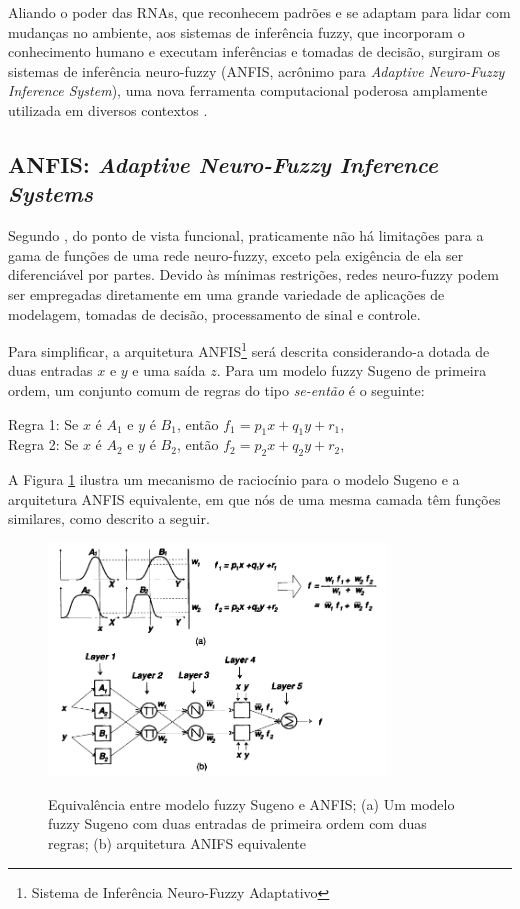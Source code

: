 Aliando o poder das RNAs, que reconhecem padrões e se adaptam para lidar com mudanças no ambiente, aos sistemas de inferência fuzzy, que incorporam o conhecimento humano e executam inferências e tomadas de decisão, surgiram os sistemas de inferência neuro-fuzzy (ANFIS, acrônimo para \textit{Adaptive Neuro-Fuzzy Inference System}), uma nova ferramenta computacional poderosa amplamente utilizada em diversos contextos \cite[p.~1]{Jang1997}.

\subsection{ANFIS: \textit{Adaptive Neuro-Fuzzy Inference Systems}}
Segundo , do ponto de vista funcional, praticamente não há limitações para a gama de funções de uma rede neuro-fuzzy, exceto pela exigência de ela ser diferenciável por partes. Devido às mínimas restrições, redes neuro-fuzzy podem ser empregadas diretamente em uma grande variedade de aplicações de modelagem, tomadas de decisão, processamento de sinal e controle.

Para simplificar, a arquitetura ANFIS\footnote{Sistema de Inferência Neuro-Fuzzy Adaptativo} será descrita considerando-a dotada de duas entradas $x$ e $y$ e uma saída $z$. Para um modelo fuzzy Sugeno de primeira ordem, um conjunto comum de regras do tipo \textit{se-então} é o seguinte:

\begin{center}
    Regra 1: Se $x$ é $A_1$ e $y$ é $B_1$, então $f_1 = p_1x + q_1y + r_1$,\\
    Regra 2: Se $x$ é $A_2$ e $y$ é $B_2$, então $f_2 = p_2x + q_2y + r_2$,  
\end{center}

A Figura \ref{fig:anfis} ilustra um mecanismo de raciocínio para o modelo Sugeno e a arquitetura ANFIS equivalente, em que nós de uma mesma camada têm funções similares, como descrito a seguir.
\begin{figure}[!htb]
    \centering
    \caption{Equivalência entre modelo fuzzy Sugeno e ANFIS; (a) Um modelo fuzzy Sugeno com duas entradas de primeira ordem com duas regras; (b) arquitetura ANIFS equivalente}
    \includegraphics[width=0.8\textwidth]{./04-figuras/fund_teorica/anfis}
    \label{fig:anfis}
\end{figure}


